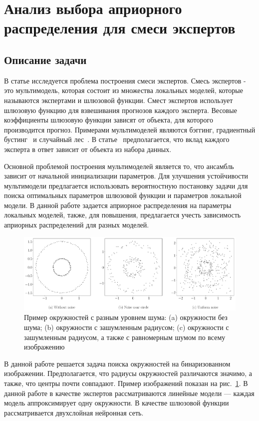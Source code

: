 \newpage

\section{Анализ выбора априорного распределения для смеси экспертов}

\subsection{Описание задачи}
В статье исследуется проблема построения смеси экспертов.
Смесь экспертов - это мультимодель, которая состоит из множества локальных моделей, которые называются экспертами и шлюзовой функции.
Смест экспертов использует шлюзовую функцию для взвешивания прогнозов каждого эксперта.
Весовые коэффициенты шлюзовую функции зависят от объекта, для которого производится прогноз.
Примерами мультимоделей являются бэггинг,  градиентный бустинг~\cite{Tianqi2016} и случайный лес~\cite{Ishwaran2012}.
В статье~\cite{Yuksel2012} предполагается, что вклад каждого эксперта в ответ зависит от объекта из набора данных.

Основной проблемой построения мультимоделей является то, что ансамбль зависит от начальной инициализации параметров. Для улучшения устойчивости мультимодели предлагается использовать вероятностную постановку задачи для поиска оптимальных параметров шлюзовой функции и параметров локальной модели. В данной работе задается априорное распределения на параметры локальных моделей, также, для повышения, предлагается учесть зависимость априорных распределений для разных моделей.

\begin{figure}[h!t]\center
\includegraphics[width=1\textwidth]{results/priorexpert/statment}
\caption{Пример окружностей с разным уровнем шума: (a) окружности без шума; (b) окружности с зашумленным радиусом; (c) окружности с зашумленным радиусом, а также с равномерным шумом по всему изображению}
\label{example:1}
\end{figure}

В данной работе решается задача поиска окружностей на бинаризованном изображении. Предполагается, что радиусы окружностей различаются значимо, а также, что центры почти совпадают. Пример изображений показан на рис.~\ref{example:1}. В данной работе в качестве экспертов рассматриваются линейные модели --- каждая модель аппроксимирует одну окружности. В качестве шлюзовой функции рассматривается двухслойная нейронная сеть.


